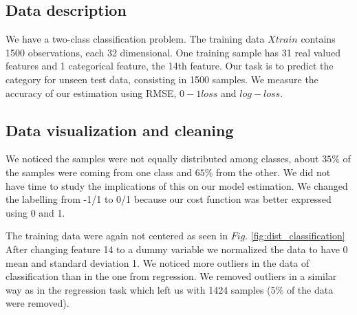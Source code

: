 \subsection{Data description}
We have a two-class classification problem. The training data $Xtrain$ contains 1500 observations, each 32 dimensional. One training sample has 31 real valued features and 1 categorical feature, the 14th feature. Our task is to predict the category for unseen test data, consisting in 1500 samples. We measure the accuracy of our estimation using RMSE, $0-1 loss$ and $log-loss$. 

\subsection{Data visualization and cleaning}
We noticed the samples were not equally distributed among classes, about $35\%$ of the samples were coming from one class and $65\%$ from the other. We did not have time to study the implications of this on our model estimation. We changed the labelling from -1/1 to 0/1 because our cost function was better expressed using 0 and 1.

The training data were again not centered as seen in $Fig.$ \ref{fig:dist_classification}
After changing feature 14 to a dummy variable we normalized the data to have 0 mean and standard deviation 1. We noticed more outliers in the data of classification than in the one from regression. We removed outliers in a similar way as in the regression task which left us with 1424 samples (5$\%$ of the data were removed).

